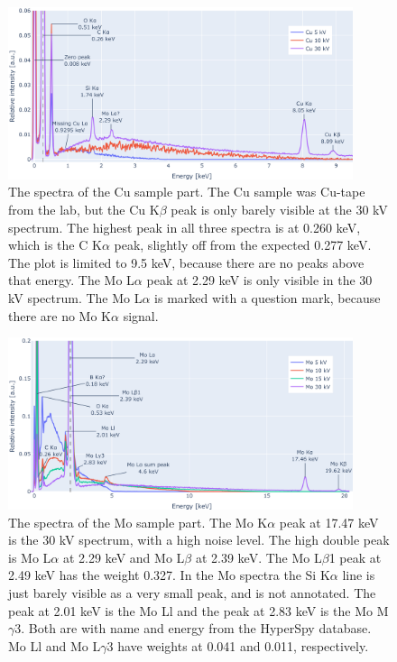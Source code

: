 \begin{figure}[h]
    \centering
    \includegraphics[width=0.90\textwidth]{figures/each_spectra_not_on_github/Cu_everything.png}
    \caption{
        The spectra of the Cu sample part.
        The Cu sample was Cu-tape from the lab, but the Cu K$\beta$ peak is only barely visible at the 30 kV spectrum.
        The highest peak in all three spectra is at 0.260 keV, which is the C K$\alpha$ peak, slightly off from the expected 0.277 keV.
        The plot is limited to 9.5 keV, because there are no peaks above that energy.
        The Mo L$\alpha$ peak at 2.29 keV is only visible in the 30 kV spectrum.
        The Mo L$\alpha$ is marked with a question mark, because there are no Mo K$\alpha$ signal.
    }
    \label{fig:results:Spectra_Cu}
\end{figure}


\begin{figure}[h!]
    \centering
    \includegraphics[width=0.90\textwidth]{figures/each_spectra_not_on_github/Mo_everything.png}
    \caption{
        The spectra of the Mo sample part.
        The Mo K$\alpha$ peak at 17.47 keV is the 30 kV spectrum, with a high noise level.
        The high double peak is Mo L$\alpha$ at 2.29 keV and Mo L$\beta$ at 2.39 keV.
        The Mo L$\beta$1 peak at 2.49 keV has the weight 0.327.
        In the Mo spectra the Si K$\alpha$ line is just barely visible as a very small peak, and is not annotated.
        The peak at 2.01 keV is the Mo Ll and the peak at 2.83 keV is the Mo M$\gamma$3.
        Both are with name and energy from the HyperSpy database.
        Mo Ll and Mo L$\gamma$3 have weights at 0.041 and 0.011, respectively.
    }
    \label{fig:results:Spectra_Mo}
\end{figure}


